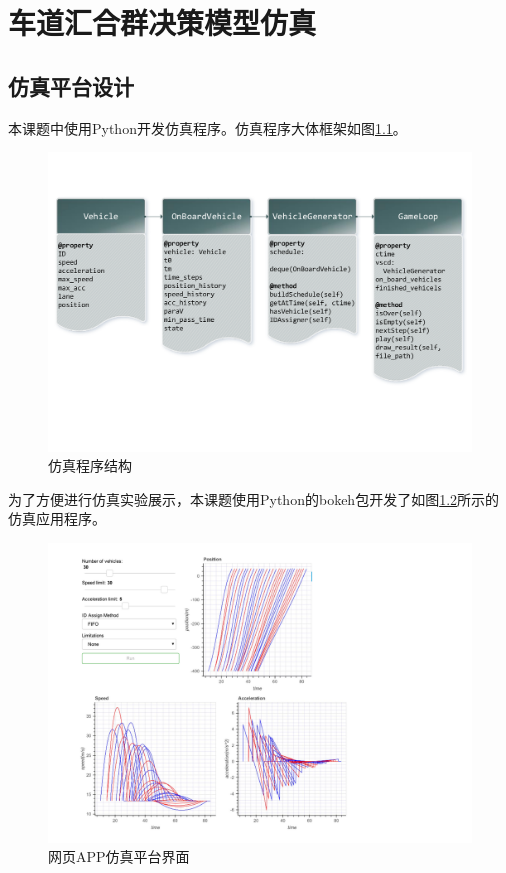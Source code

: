\chapter{车道汇合群决策模型仿真}
\label{cha:sim}

\section{仿真平台设计}
本课题中使用{\ttfamily Python}开发仿真程序。仿真程序大体框架如图\ref{fig:ss}。
\begin{figure}
\centering
\includegraphics[width=15cm,trim={0 4cm 0 2cm},clip]{figures/software_structure.pdf}
\caption{仿真程序结构}
\label{fig:ss}
\end{figure}

为了方便进行仿真实验展示，本课题使用{\ttfamily Python}的{\ttfamily bokeh}包开发了如图\ref{fig:app}所示的仿真应用程序。
\begin{figure}
\centering
\includegraphics[angle=270,trim={0 0 0 10cm},clip,width=15cm]{figures/app.pdf}
\caption{网页APP仿真平台界面}
\label{fig:app}
\end{figure}

